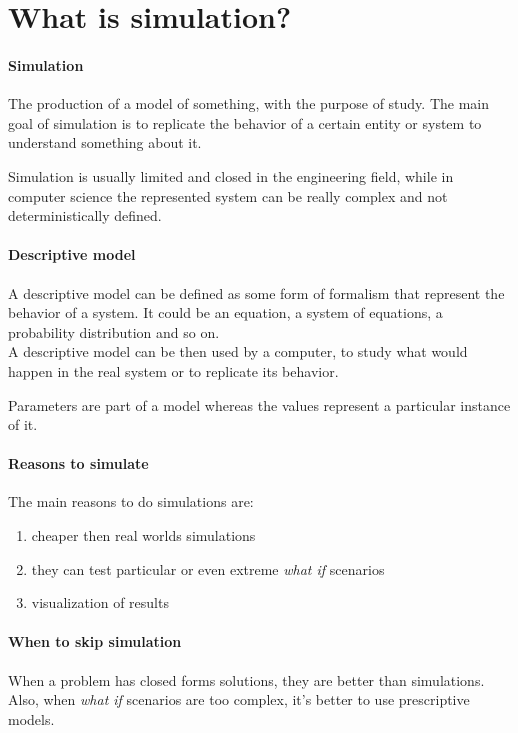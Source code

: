 \section{What is simulation?}

\paragraph{Simulation}
The production of a model of something, with the purpose 
of study. The main goal of simulation is to replicate the behavior of a certain 
entity or system to understand something about it.

Simulation is usually limited and closed in the engineering field, while 
in computer science the represented system can be really complex and
not deterministically defined.

\paragraph{Descriptive model}
A descriptive model can be defined as some form of formalism that represent 
the behavior of a system.
It could be an equation, a system of equations, a probability distribution 
and so on.\\
A descriptive model can be then used by a computer, to study what would happen 
in the real system or to replicate its behavior.

\begin{remark}
    Parameters are part of a model whereas the values represent a particular 
    instance of it.
\end{remark}

\paragraph{Reasons to simulate}
The main reasons to do simulations are:
\begin{enumerate}
    \item cheaper then real worlds simulations
    \item they can test particular or even extreme \emph{what if} scenarios
    \item visualization of results
\end{enumerate}

\paragraph{When to skip simulation}
When a problem has closed forms solutions, they 
are better than simulations.
Also, when \emph{what if} scenarios are too complex, it's better to use 
prescriptive models.


